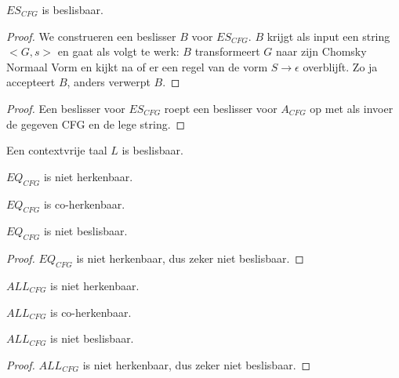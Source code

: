 \documentclass[main.tex]{subfiles}
\begin{document}
\begin{st}
  \label{st:es-cfg-besl}
  $ES_{CFG}$ is beslisbaar.

  \begin{proof}
    We construeren een beslisser $B$ voor $ES_{CFG}$.
    $B$ krijgt als input een string $<G,s>$ en gaat als volgt te werk:
    $B$ transformeert $G$ naar zijn Chomsky Normaal Vorm en kijkt na of er een regel van de vorm $S \rightarrow \epsilon$ overblijft.
    Zo ja accepteert $B$, anders verwerpt $B$.
  \end{proof}

  \begin{proof}
    Een beslisser voor $ES_{CFG}$ roept een beslisser voor $A_{CFG}$ op met als invoer de gegeven CFG en de lege string.
  \end{proof}
\end{st}

\begin{st}
  \label{st:contextvrije-taal-besl}
  Een contextvrije taal $L$ is beslisbaar.

\end{st}

\begin{st}
  \label{st:eq-cfg-niet-herk}
  $EQ_{CFG}$ is niet herkenbaar.
\end{st}

\begin{st}
  \label{st:eq-cfg-coherk}
  $EQ_{CFG}$ is co-herkenbaar.
\end{st}

\begin{gev}
  \label{gev:eq-cfg-niet-besl}
  $EQ_{CFG}$ is niet beslisbaar.

  \begin{proof}
    $EQ_{CFG}$ is niet herkenbaar, dus zeker niet beslisbaar.
  \end{proof}
\end{gev}

\begin{st}
  \label{st:all-cfg-niet-herk}
  $ALL_{CFG}$ is niet herkenbaar. \zb
\end{st}

\begin{st}
  \label{st:all-cfg-coherk}
  $ALL_{CFG}$ is co-herkenbaar.
\end{st}

\begin{gev}
  \label{gev:all-cfg-niet-besl}
  $ALL_{CFG}$ is niet beslisbaar.

  \begin{proof}
    $ALL_{CFG}$ is niet herkenbaar, dus zeker niet beslisbaar.
  \end{proof}
\end{gev}
\end{document}
